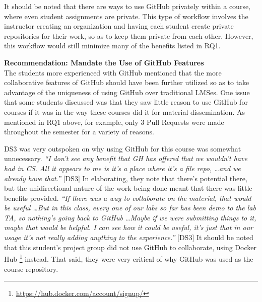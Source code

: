 It should be noted that there are ways to use GitHub privately within a course, where even student assignments are private. This type of workflow involves the instructor creating an organization and having each student create private repositories for their work, so as to keep them private from each other. However, this workflow would still minimize many of the benefits listed in RQ1.


\textbf{Recommendation: Mandate the Use of GitHub Features} \\
The students more experienced with GitHub mentioned that the more collaborative features of GitHub should have been further utilized so as to take advantage of the uniqueness of using GitHub over traditional LMSes. One issue that some students discussed was that they saw little reason to use GitHub for courses if it was in the way these courses did it for material dissemination. As mentioned in RQ1 above, for example, only 3 Pull Requests were made throughout the semester for a variety of reasons.

DS3 was very outspoken on why using GitHub for this course was somewhat unnecessary. \textit{``I don't see any benefit that GH has offered that we wouldn't have had in CS. All it appears to me is it's a place where it's a file repo, \ldots and we already have that.''} [DS3] In elaborating, they note that there's potential there, but the unidirectional nature of the work being done meant that there was little benefits provided. \textit{``If there was a way to collaborate on the material, that would be useful \ldots But in this class, every one of our labs so far has been demo to the lab TA, so nothing's going back to GitHub \ldots Maybe if we were submitting things to it, maybe that would be helpful. I can see how it could be useful, it's just that in our usage it's not really adding anything to the experience.''} [DS3] It should be noted that this student's project group did not use GitHub to collaborate, using Docker Hub \footnote{\url{https://hub.docker.com/account/signup/}} instead. That said, they were very critical of why GitHub was used as the course repository.

